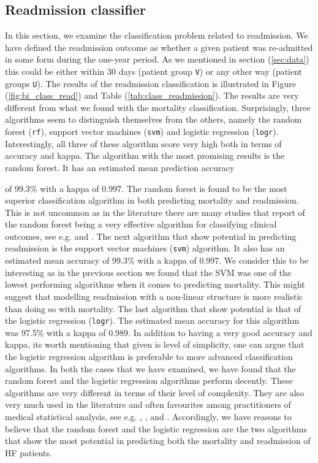 \documentclass[../thesis.tex]{subfiles}
\begin{document}
\subsection{Readmission classifier}

\noindent In this section, we examine the classification problem related to readmission. We have defined the readmission outcome as whether a given patient was re-admitted in some form during the one-year period. As we mentioned in section (\ref{sec:data}) this could be either within 30 days (patient group \texttt{V}) or any other way (patient groups \texttt{U}). The results of the readmission classification is illustrated in Figure (\ref{fig:bi_class_read}) and Table (\ref{tab:class_readmission}). The results are very different from what we found with the mortality classification. Surprisingly, three algorithms seem to distinguish themselves from the others, namely the random forest (\texttt{rf}), support vector machines (\texttt{svm}) and logistic regression (\texttt{logr}). Interestingly, all three of these algorithm score very high both in terms of accuracy and kappa. The algorithm with the most promising results is the random forest. It has an estimated mean prediction accuracy

\vspace*{0,25cm}

\noindent of 99.3\% with a kappa of 0.997. The random forest is found to be the most superior classification algorithm in both predicting mortality and readmission. This is not uncommon as in the literature there are many studies that report of the random forest being a very effective algorithm for classifying clinical outcomes, see e.g. \cite{austin2013using} and \cite{zolfaghar2013big}. The next algorithm that show potential in predicting readmission is the support vector machines (\texttt{svm}) algorithm. It also has an estimated mean accuracy of 99.3\% with a kappa of 0.997. We consider this to be interesting as in the previous section we found that the SVM was one of the lowest performing algorithms when it comes to predicting mortality. This might suggest that modelling readmission with a non-linear structure is more realistic than doing so with mortality. The last algorithm that show potential is that of the logistic regression (\texttt{logr}). The estimated mean accuracy for this algorithm was 97.5\% with a kappa of 0.989. In addition to having a very good accuracy and kappa, its worth mentioning that given is level of simplicity, one can argue that the logistic regression algorithm is preferable to more advanced classification algorithms. In both the cases that we have examined, we have found that the random forest and the logistic regression algorithms perform decently. These algorithms are very different in terms of their level of complexity. They are also very much used in the literature and often favourites among practitioners of medical statistical analysis, see e.g. \cite{austin2013using}, \cite{zolfaghar2013big}, \cite{shah2014phenomapping} and \cite{panahiazar2015using}. Accordingly, we have reasons to believe that the random forest and the logistic regression are the two algorithms that show the most potential in predicting both the mortality and readmission of HF patients.
\end{document}
